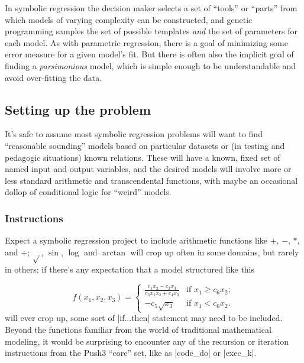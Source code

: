 \documentclass[12pt]{article}
\begin{document}
In symbolic regression the decision maker selects a set of ``tools'' or ``parts'' from which models of varying complexity can be constructed, and genetic programming samples the set of possible templates \emph{and} the set of parameters for each model. As with parametric regression, there is a goal of minimizing some error measure for a given model's fit. But there is often also the implicit goal of finding a \emph{parsimonious} model, which is simple enough to be understandable and avoid over-fitting the data.

\subsection{Setting up the problem}

It's safe to assume most symbolic regression problems will want to find ``reasonable sounding'' models based on particular datasets or (in testing and pedagogic situations) known relations. These will have a known, fixed set of named input and output variables, and the desired models will involve more or less standard arithmetic and transcendental functions, with maybe an occasional dollop of conditional logic for ``weird'' models.

\subsubsection{Instructions}

Expect a symbolic regression project to include arithmetic functions like $+$, $-$, $*$, and $\div$; $\sqrt{}$, $\sin{}$, $\log{}$ and $\arctan{}$ will crop up often in some domains, but rarely in others; if there's any expectation that a model structured like this

\begin{equation*}
f(x_{1}, x_{2}, x_{3}) = \left \{ \begin{array}{ll} \frac{c_{1}x_{2}-c_{2}x_{3}}{c_{3}x_{1}x_{2}+c_{4}x_{3}} & \mbox{if $x_{1} \geq c_{6}x_{2}$};\\ -c_{5}\sqrt{x_{3}} & \mbox{if $x_{1} < c_{6}x_{2}$}.\end{array} \right.
\end{equation*}
will ever crop up, some sort of |if...then| statement may need to be included. Beyond the functions familiar from the world of traditional mathematical modeling, it would be surprising to encounter any of the recursion or iteration instructions from the Push3 ``core'' set, like as |code_do| or |exec_k|.
\end{document}
